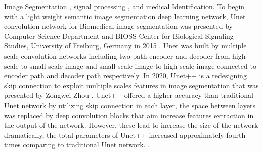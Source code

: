 \documentclass[journal]{IEEEtran} %
\begin{document}
Image Segmentation \cite{b5}, signal processing \cite{b1} \cite{b2}, and medical Identification. To begin with a light weight semantic image segmentation deep learning network, Unet convolution network for Biomedical image segmentation was presented by Computer Science Department and BIOSS Center for Biological Signaling Studies, University of Freiburg, Germany in 2015 \cite{b5}. Unet was built by multiple scale convolution networks including two path encoder and decoder from high-scale to small-scale image and small-scale image to high-scale image connected to encoder path and decoder path respectively. In 2020, Unet++ is a redesigning skip connection to exploit multiple scales features in image segmentation that was presented by Zongwei Zhou \cite{b6}. Unet++ offered a higher accuracy than traditional Unet network by utilizing skip connection in each layer, the space between layers was replaced by deep convolution blocks that aim increase features extraction in the output of the network. However, these lead to increase the size of the network dramatically, the total parameters of Unet++ increased approximately fourth times comparing to traditional Unet network. \cite{b6}.
\\
\indent
\end{document}
